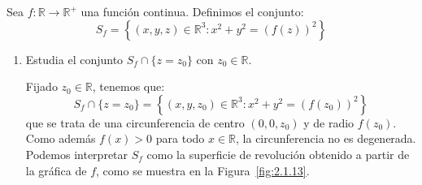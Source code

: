 \begin{ejercicio}
    Sea $f:\mathbb{R}\to \mathbb{R}^+$ una función continua. Definimos el conjunto:
    \begin{equation*}
        S_f = \left\{(x,y,z)\in \mathbb{R}^3: x^2+y^2 = {(f(z))}^{2}\right\}
    \end{equation*}
    \begin{enumerate}[label=\alph*)]
        \item Estudia el conjunto $S_f\cap \{z=z_0\}$ con $z_0\in \mathbb{R}$.

            Fijado $z_0\in \mathbb{R}$, tenemos que:
            \begin{equation*}
                S_f \cap \{z=z_0\} = \left\{(x,y,z_0)\in \mathbb{R}^3 : x^2+y^2 = {(f(z_0))}^{2}\right\}
            \end{equation*}
            que se trata de una circunferencia de centro $(0,0,z_0)$ y de radio $f(z_0)$. Como además $f(x)>0$ para todo $x\in \mathbb{R}$, la circunferencia no es degenerada.
            Podemos interpretar $S_f$ como la superficie de revolución obtenido a partir de la gráfica de $f$, como se muestra en la Figura~\ref{fig:2.1.13}.
            \begin{figure}[h]
                \centering
\end{figure}
\end{enumerate}
\end{ejercicio}
